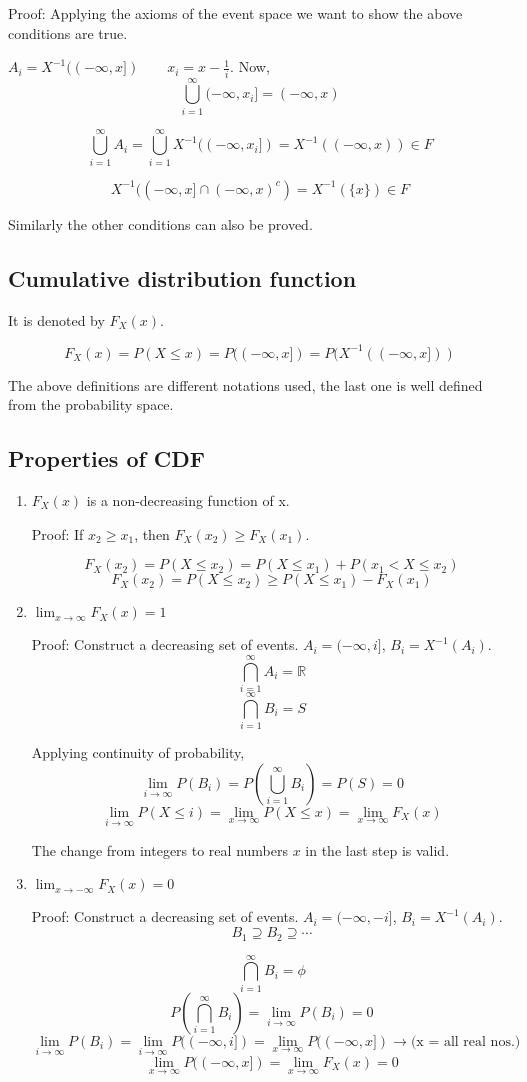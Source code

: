 \documentclass{article}
\begin{document}
Proof: Applying the axioms of the event space we want to show the above conditions are true.

$A_i=X^{-1}((-\infty,x]) \qquad x_i = x - \frac{1}{i}$. Now,
$$ \bigcup_{i=1}^{\infty} (-\infty,x_i] = (-\infty,x)$$

$$ \bigcup_{i=1}^{\infty} A_i = \bigcup_{i=1}^{\infty} X^{-1}((-\infty,x_i]) = X^{-1}((-\infty,x)) \in F$$

$$ X^{-1}((-\infty ,x] \cap {(-\infty,x)}^c) = X^{-1} (\{x\}) \in F$$

Similarly the other conditions can also be proved.

\subsection{Cumulative distribution function}
It is denoted by $F_X(x)$.

$$ F_X(x)= P(X \leq x) = P((-\infty, x])= P(X^{-1}((-\infty, x]))$$

The above definitions are different notations used, the last one is well defined from the probability space.

\subsection{Properties of CDF}

\begin{enumerate}
    \item $F_X(x)$ is a non-decreasing function of x.

    Proof: If $x_2 \geq x_1$, then $F_X(x_2) \geq F_X(x_1)$.

    $$F_X(x_2) = P(X \leq x_2)= P(X \leq x_1)+P(x_1 < X \leq x_2)$$
    $$F_X(x_2) = P(X \leq x_2) \geq P(X \leq x_1) -F_X(x_1) $$

    \item $\lim_{x \to \infty} F_X(x)= 1$

    Proof: Construct a decreasing set of events. $A_i= (-\infty, i]$, $B_i = X^{-1}(A_i)$.
    $$ \bigcap_{i=1}^{\infty}A_i= \mathbb{R}$$
    $$ \bigcap_{i=1}^{\infty}B_i= S $$

    Applying continuity of probability,
    $$ \lim_{i \to \infty}P(B_i)= P(\bigcup_{i=1}^{\infty}B_i) =P(S) = 0$$
    $$ \lim_{i \to \infty}P(X \leq i)= \lim_{x \to \infty}P(X \leq x) = \lim_{x \to \infty} F_X(x)$$

    The change from integers to real numbers $x$ in the last step is valid.

    \item $\lim_{x \to -\infty} F_X(x)= 0$

    Proof: Construct a decreasing set of events. $A_i= (-\infty, -i]$, $B_i = X^{-1}(A_i)$.
    $$ B_1 \supseteq B_2 \supseteq \cdots$$

    $$ \bigcap_{i=1}^{\infty}B_i= \phi $$
    $$ P(\bigcap_{i=1}^{\infty}B_i) = \lim_{i \to \infty}P(B_i)= 0$$
    $$  \lim_{i \to \infty}P(B_i) =  \lim_{i \to \infty}P((-\infty,i])= \lim_{x \to \infty}P((-\infty,x]) \rightarrow \text{(x = all real nos.)}$$
    $$ \lim_{x \to \infty}P((-\infty,x]) = \lim_{x \to \infty}F_X(x)= 0$$


\end{enumerate}
\end{document}
